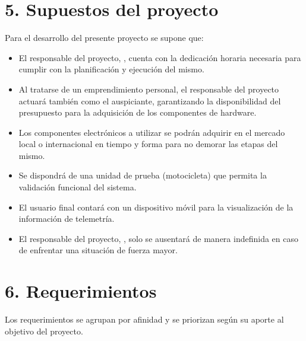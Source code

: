 \documentclass[
11pt, %
]{charter}
\begin{document}
\section{5. Supuestos del proyecto}
\label{sec:supuestos}

Para el desarrollo del presente proyecto se supone que:

\begin{itemize}
	\item El responsable del proyecto, \authorname, cuenta con la dedicación horaria necesaria para cumplir con la planificación y ejecución del mismo.
	\item Al tratarse de un emprendimiento personal, el responsable del proyecto actuará también como el auspiciante, garantizando la disponibilidad del presupuesto para la adquisición de los componentes de hardware.
	\item Los componentes electrónicos a utilizar se podrán adquirir en el mercado local o internacional en tiempo y forma para no demorar las etapas del mismo.
	\item Se dispondrá de una unidad de prueba (motocicleta) que permita la validación funcional del sistema.
	\item El usuario final contará con un dispositivo móvil para la visualización de la información de telemetría.
	\item El responsable del proyecto, \authorname, solo se ausentará de manera indefinida en caso de enfrentar una situación de fuerza mayor.
\end{itemize}

\pagebreak

\section{6. Requerimientos}
\label{sec:requerimientos}

Los requerimientos se agrupan por afinidad y se priorizan según su aporte al objetivo del proyecto.
\end{document}
